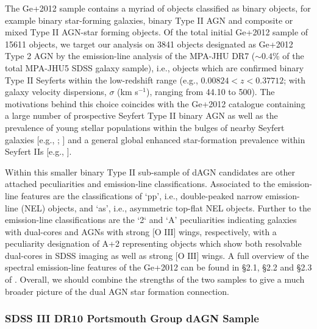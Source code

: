 The Ge+2012 sample contains a myriad of objects classified as binary objects, for example binary star-forming galaxies, binary Type II AGN and composite or mixed Type II AGN-star forming objects. Of the total initial Ge+2012 sample of 15611 objects, we target our analysis on 3841 objects designated as Ge+2012 Type 2 AGN by the emission-line analysis of the MPA-JHU DR7 ($\sim{0.4}$\% of the total MPA-JHU5 SDSS galaxy sample), i.e., objects which are confirmed binary Type II Seyferts within the low-redshift range (e.g., ${0.00824}<{z}<{0.37712}$; with galaxy velocity dispersions, $\sigma$ (km s$^{-1}$), ranging from 44.10 to 500). The motivations behind this choice coincides with the Ge+2012 catalogue containing a large number of prospective Seyfert Type II binary AGN as well as the prevalence of young stellar populations within the bulges of nearby Seyfert galaxies [e.g., \cite{1990MNRAS.242..271T}; \cite{Delgado_2001}] and a general global enhanced star-formation prevalence within Seyfert IIs [e.g., \cite{2006MNRAS.366..480G}].  

Within this smaller binary Type II sub-sample of dAGN candidates are other attached peculiarities and emission-line classifications. Associated to the emission-line features are the classifications of `pp', i.e., double-peaked narrow emission-line (NEL) objects, and `as', i.e., asymmetric top-flat NEL objects. Further to the emission-line classifications are the `2` and `A' peculiarities indicating galaxies with dual-cores and AGNs with strong $\text{[O III]}$ wings, respectively, with a peculiarity designation of A+2 representing objects which show both resolvable dual-cores in SDSS imaging as well as strong $\text{[O III]}$ wings. A full overview of the spectral emission-line features of the Ge+2012 can be found in §2.1, §2.2 and §2.3 of \cite{Ge_Hu_Wang_Bai_Zhang_2012}. Overall, we should combine the strengths of the two samples to give a much broader picture of the dual AGN star formation connection.    

\subsubsection{SDSS III DR10 Portsmouth Group dAGN Sample}

